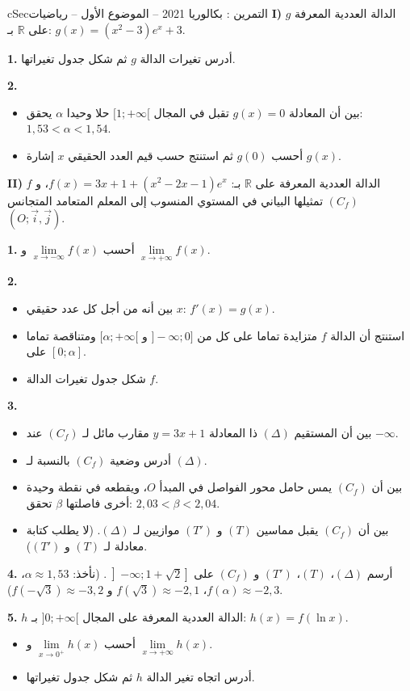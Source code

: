 \documentclass[12pt,a4paper]{article}
\newenvironment{BOX}[2]{\begin{otherlanguage}{english}\begin{arbox}{#1}{#2}}{\end{arbox}\end{otherlanguage}}
\newcounter{exo}
\newenvironment{tamrin}[1]{\stepcounter{exo}\begin{BOX}{cSec}{التمرين \theexo: #1}}{\end{BOX}}
\newcommand{\R}{\mathbb{R}}
\newenvironment{sq}{\begin{itemize}[leftmargin=2.4em,itemsep=3pt]}{\end{itemize}}
\newcommand{\qa}{\item[(أ)]}\newcommand{\qb}{\item[(ب)]}\newcommand{\qc}{\item[(جـ)]}\newcommand{\qd}{\item[(د)]}\newcommand{\qe}{\item[(هـ)]}
\newcommand{\QQ}[1]{\par\smallskip\textbf{#1.} }
\begin{document}
\begin{tamrin}{بكالوريا 2021 -- الموضوع الأول -- رياضيات}
\textbf{I)} $g$ الدالة العددية المعرفة على $\R$ بـ: $g(x)=\left(x^2-3\right)e^{x}+3$.
\QQ{1} أدرس تغيرات الدالة $g$ ثم شكل جدول تغيراتها.
\QQ{2}
\begin{sq}
\qa بين أن المعادلة $g(x)=0$ تقبل في المجال $[1;+\infty[$ حلا وحيدا $\alpha$ يحقق: $1{,}53<\alpha<1{,}54$.
\qb أحسب $g(0)$ ثم استنتج حسب قيم العدد الحقيقي $x$ إشارة $g(x)$.
\end{sq}

\textbf{II)} $f$ الدالة العددية المعرفة على $\R$ بـ: $f(x)=3x+1+\left(x^2-2x-1\right)e^{x}$، و $(C_f)$ تمثيلها البياني في المستوي المنسوب إلى المعلم المتعامد المتجانس $(O;\vec i,\vec j)$.
\QQ{1} أحسب $\lim\limits_{x\to-\infty}f(x)$ و $\lim\limits_{x\to+\infty}f(x)$.
\QQ{2}
\begin{sq}
\qa بين أنه من أجل كل عدد حقيقي $x$: $f'(x)=g(x)$.
\qb استنتج أن الدالة $f$ متزايدة تماما على كل من $]{-}\infty;0]$ و $[\alpha;+\infty[$ ومتناقصة تماما على $[0;\alpha]$.
\qc شكل جدول تغيرات الدالة $f$.
\end{sq}
\QQ{3}
\begin{sq}
\qa بين أن المستقيم $(\Delta)$ ذا المعادلة $y=3x+1$ مقارب مائل لـ $(C_f)$ عند $-\infty$.
\qb أدرس وضعية $(C_f)$ بالنسبة لـ $(\Delta)$.
\qc بين أن $(C_f)$ يمس حامل محور الفواصل في المبدأ $O$، ويقطعه في نقطة وحيدة أخرى فاصلتها $\beta$ تحقق: $2{,}03<\beta<2{,}04$.
\qd بين أن $(C_f)$ يقبل مماسين $(T)$ و $(T')$ موازيين لـ $(\Delta)$. (لا يطلب كتابة معادلة لـ $(T)$ و $(T')$).
\end{sq}
\QQ{4} أرسم $(\Delta)$، $(T)$، $(T')$ و $(C_f)$ على $\left]{-}\infty;1+\sqrt2\right]$.
(نأخذ: $\alpha\approx1{,}53$، $f(\alpha)\approx-2{,}3$، $f(\sqrt3)\approx-2{,}1$ و $f(-\sqrt3)\approx-3{,}2$).
\QQ{5} $h$ الدالة العددية المعرفة على المجال $]0;+\infty[$ بـ: $h(x)=f(\ln x)$.
\begin{sq}
\qa أحسب $\lim\limits_{x\to0^{+}}h(x)$ و $\lim\limits_{x\to+\infty}h(x)$.
\qb أدرس اتجاه تغير الدالة $h$ ثم شكل جدول تغيراتها.
\end{sq}
\end{tamrin}
\end{document}
